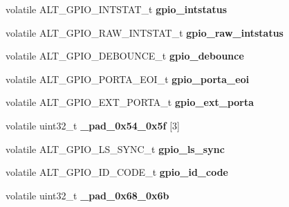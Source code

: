\begin{DoxyCompactItemize}
\mbox{\label{structALT__GPIO__s_a262608a82deb2b7adb45349c1ce03b33}} 
volatile A\+L\+T\+\_\+\+G\+P\+I\+O\+\_\+\+I\+N\+T\+S\+T\+A\+T\+\_\+t {\bfseries gpio\+\_\+intstatus}
\item 
\mbox{\label{structALT__GPIO__s_a6504f9d554b3a2f0ac4351353f21cb3e}} 
volatile A\+L\+T\+\_\+\+G\+P\+I\+O\+\_\+\+R\+A\+W\+\_\+\+I\+N\+T\+S\+T\+A\+T\+\_\+t {\bfseries gpio\+\_\+raw\+\_\+intstatus}
\item 
\mbox{\label{structALT__GPIO__s_aadb89cad12bad0b44a61ef52a5f0ef50}} 
volatile A\+L\+T\+\_\+\+G\+P\+I\+O\+\_\+\+D\+E\+B\+O\+U\+N\+C\+E\+\_\+t {\bfseries gpio\+\_\+debounce}
\item 
\mbox{\label{structALT__GPIO__s_a1c0344dfd012a16d8b300851d8dee9c7}} 
volatile A\+L\+T\+\_\+\+G\+P\+I\+O\+\_\+\+P\+O\+R\+T\+A\+\_\+\+E\+O\+I\+\_\+t {\bfseries gpio\+\_\+porta\+\_\+eoi}
\item 
\mbox{\label{structALT__GPIO__s_a9a9f73e1861f2820ee96ba03d415972a}} 
volatile A\+L\+T\+\_\+\+G\+P\+I\+O\+\_\+\+E\+X\+T\+\_\+\+P\+O\+R\+T\+A\+\_\+t {\bfseries gpio\+\_\+ext\+\_\+porta}
\item 
\mbox{\label{structALT__GPIO__s_a69d8b104055b1d57c555e5f3698a3199}} 
volatile uint32\+\_\+t {\bfseries \+\_\+pad\+\_\+0x54\+\_\+0x5f} \mbox{[}3\mbox{]}
\item 
\mbox{\label{structALT__GPIO__s_a965c6a5c0e4a056ecf85ab54725fa23c}} 
volatile A\+L\+T\+\_\+\+G\+P\+I\+O\+\_\+\+L\+S\+\_\+\+S\+Y\+N\+C\+\_\+t {\bfseries gpio\+\_\+ls\+\_\+sync}
\item 
\mbox{\label{structALT__GPIO__s_ac9d6ba696d2168de9570c4c2630ec00f}} 
volatile A\+L\+T\+\_\+\+G\+P\+I\+O\+\_\+\+I\+D\+\_\+\+C\+O\+D\+E\+\_\+t {\bfseries gpio\+\_\+id\+\_\+code}
\item 
\mbox{\label{structALT__GPIO__s_a0f84310faa86c47dc25b915cfecc163e}} 
volatile uint32\+\_\+t {\bfseries \+\_\+pad\+\_\+0x68\+\_\+0x6b}
\item 
\mbox{\label{structALT__GPIO__s_aaa8ade9c2cc38d36ac2761aab9193290}} 

\end{DoxyCompactItemize}
